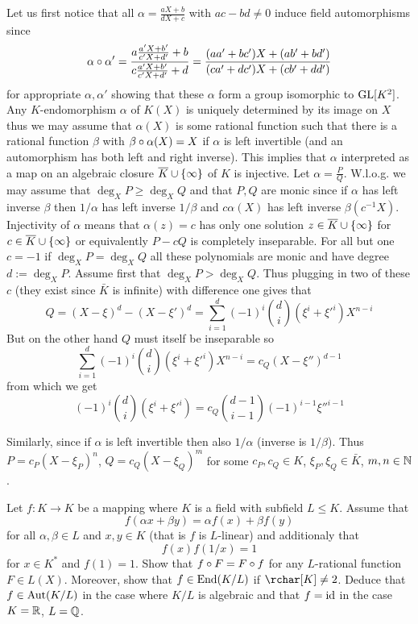 \documentclass[8pt,a4paper]{article}
\begin{document}
\begin{solution}    
    Let us first notice that all $\alpha=\frac{aX+b}{dX+c}$ with $ac-bd\neq 0$ induce field automorphisms since $$\alpha\circ\alpha'=\frac{a\frac{a'X+b'}{c'X+d'}+b}{c\frac{a'X+b'}{c'X+d'}+d}=\frac{(aa'+bc')X+(ab'+bd')}{(ca'+dc')X+(cb'+dd')}$$for appropriate $\alpha,\alpha'$ showing that these $\alpha$ form a group isomorphic to $\mathrm{GL}[K^2]$.
    Any $K$-endomorphism $\alpha$ of $K(X)$ is uniquely determined by its image on $X$ thus we may assume that
    $\alpha(X)$ is some rational function such that there is a rational function $\beta$ with $\beta\circ\alpha(X)=X$ if $\alpha$ is left invertible (and an automorphism has both left and right inverse). This implies that $\alpha$ interpreted as a map on an algebraic closure $\bar{K}\setjoin\set{\infty}$ of $K$ is injective.
    Let $\alpha=\frac{P}{Q}$. W.l.o.g. we may assume that $\deg_X{P}\geq\deg_X{Q}$ and that $P,Q$ are monic since if $\alpha$ has left inverse $\beta$ then $1/\alpha$ has left inverse $1/\beta$ and $c\alpha(X)$ has left inverse $\beta(c^{-1}X)$.
    Injectivity of $\alpha$ means that $\alpha(z)=c$ has only one solution $z\in \bar{K}\setjoin\set{\infty}$ for $c\in\bar{K}\setjoin\set{\infty}$ or equivalently $P-cQ$ is completely inseparable. For all but one $c=-1$ if $\deg_X{P}=\deg_X{Q}$ all these polynomials are monic and have degree $d:=\deg_X{P}$.
    Assume first that $\deg_X{P}>\deg_X{Q}$. Thus plugging in two of these $c$ (they exist since $\bar{K}$ is infinite) with difference one gives that
    $$Q={(X-\xi)}^d-{(X-\xi')}^d=\sum_{i=1}^d{{(-1)}^i\binom{d}{i}(\xi^i+{\xi'}^i)X^{n-i}}$$
    But on the other hand $Q$ must itself be inseparable so
    $$\sum_{i=1}^d{{(-1)}^i\binom{d}{i}(\xi^i+{\xi'}^i)X^{n-i}}=c_Q{(X-{\xi''})}^{d-1}$$
    from which we get
    $${(-1)}^i\binom{d}{i}(\xi^i+{\xi'}^i)=c_Q\binom{d-1}{i-1}{(-1)}^{i-1}{\xi''}^{i-1}$$

   
Similarly, since if $\alpha$ is left invertible then also $1/\alpha$ (inverse is $1/\beta$). Thus $P=c_P(X-\xi_P)^n$, $Q=c_Q(X-\xi_Q)^m$ for some $c_P,c_Q\in K$, $\xi_P,\xi_Q\in\bar{K}$, $m,n\in\mathbb{N}$. 
\end{solution}

\begin{exercise}\label{cauchy-f-eq}
    Let $f:K\to K$ be a mapping where $K$ is a field with subfield $L\leq K$. Assume that
    \[
    f(\alpha x+\beta y)=\alpha f(x)+\beta f(y)
    \]
    for all $\alpha,\beta\in L$ and $x,y\in K$ (that is $f$ is $L$-linear) and additionaly that
    \[
    f(x)f(1/x)=1
    \]
    for $x\in K^{\ast}$ and $f(1)=1$.
    Show that $f\circ F=F\circ f$ for any $L$-rational function $F\in L(X)$. Moreover, show that $f\in\End(K/L)$ if $\rchar[K]\neq 2$.
    Deduce that $f\in\mathop\mathrm{Aut}\nolimits(K/L)$ in the case where $K/L$ is algebraic and that $f=\mathop\mathrm{id}\nolimits$ in the case $K=\mathbb{R}$, $L=\mathbb{Q}$.
\end{exercise}
\end{document}

